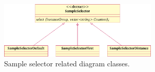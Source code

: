 \begin{figure}
  \centering
  \includegraphics[width=0.675\textwidth]{figures/user-guide/tool-design-interpolate-sample-selector.pdf}
  \caption{Sample selector related diagram classes.}
  \label{fig:tool_design_interpolate_sample_selector}
\end{figure}
